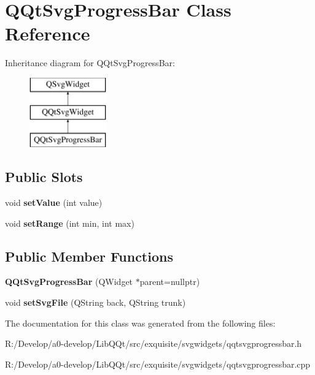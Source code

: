 \hypertarget{class_q_qt_svg_progress_bar}{}\section{Q\+Qt\+Svg\+Progress\+Bar Class Reference}
\label{class_q_qt_svg_progress_bar}
Inheritance diagram for Q\+Qt\+Svg\+Progress\+Bar\+:\begin{figure}[H]
\begin{center}
\leavevmode
\includegraphics[height=3.000000cm]{class_q_qt_svg_progress_bar}
\end{center}
\end{figure}
\subsection*{Public Slots}
\begin{DoxyCompactItemize}
\item 
\mbox{\label{class_q_qt_svg_progress_bar_a2f071d40d0357f6d82b230b31f89d187}} 
void {\bfseries set\+Value} (int value)
\item 
\mbox{\label{class_q_qt_svg_progress_bar_afcde4e8214510cc1bb52ccca41253960}} 
void {\bfseries set\+Range} (int min, int max)
\end{DoxyCompactItemize}
\subsection*{Public Member Functions}
\begin{DoxyCompactItemize}
\item 
\mbox{\label{class_q_qt_svg_progress_bar_aaa7b20bb00e65c8f2c74e846129ecca3}} 
{\bfseries Q\+Qt\+Svg\+Progress\+Bar} (Q\+Widget $\ast$parent=nullptr)
\item 
\mbox{\label{class_q_qt_svg_progress_bar_ad66c16a91280df7c4ba6b243a422645d}} 
void {\bfseries set\+Svg\+File} (Q\+String back, Q\+String trunk)
\end{DoxyCompactItemize}


The documentation for this class was generated from the following files\+:\begin{DoxyCompactItemize}
\item 
R\+:/\+Develop/a0-\/develop/\+Lib\+Q\+Qt/src/exquisite/svgwidgets/qqtsvgprogressbar.\+h\item 
R\+:/\+Develop/a0-\/develop/\+Lib\+Q\+Qt/src/exquisite/svgwidgets/qqtsvgprogressbar.\+cpp\end{DoxyCompactItemize}
